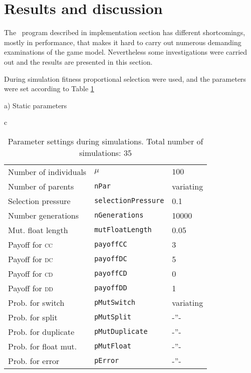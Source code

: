 \section{Results and discussion}\label{sec:results}
The \matlab\ program described in implementation section has different shortcomings, mostly in performance, that makes it hard to carry out numerous demanding examinations of the game model. Nevertheless some investigations were carried out and the results are presented in this section.

During simulation fitness proportional selection were used, and the parameters were set according to Table \ref{tab:results:parameters}


\begin{table}[!hbtp]
  \centering
  \caption{Parameter settings during simulations. Total number of simulations: 35}
  \label{tab:results:parameters}
  \footnotesize

  a) Static parameters %
  \myhalfpar

  \begin{tabular}{c}
    \begin{tabular}{ll@{$~=~$}l}
      \hline
      Number of individuals        & $\mu$                      & $100$  \\
      Number of parents        & \texttt{nPar}              & variating \\
      Selection pressure     & \texttt{selectionPressure} & 0.1    \\
      Number generations     & \texttt{nGenerations}      & 10000  \\
      Mut. float length      & \texttt{mutFloatLength}    & 0.05   \\
      \hline
      Payoff for \textsc{cc} & \texttt{payoffCC}          & 3      \\
      Payoff for \textsc{dc} & \texttt{payoffDC}          & 5      \\
      Payoff for \textsc{cd} & \texttt{payoffCD}          & 0         \\
      Payoff for \textsc{dd} & \texttt{payoffDD}          & 1         \\
      \hline
      Prob. for switch       & \texttt{pMutSwitch}        & variating \\
      Prob. for split        & \texttt{pMutSplit}         & -''-      \\
      Prob. for duplicate    & \texttt{pMutDuplicate}     & -''-      \\
      Prob. for float mut.   & \texttt{pMutFloat}         & -''-      \\
      Prob. for error        & \texttt{pError}            & -''-      \\
      \hline
    \end{tabular}
  \end{tabular}\mypar


\end{table}
